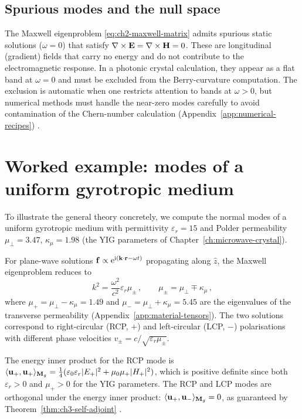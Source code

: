 \subsection{Spurious modes and the null space}
\label{sec:ch3-spurious}

The Maxwell eigenproblem \eqref{eq:ch2-maxwell-matrix} admits spurious
static solutions ($\omega=0$) that satisfy
$\nabla\times\mathbf{E}=\nabla\times\mathbf{H}=0$.  These are longitudinal
(gradient) fields that carry no energy and do not contribute to the
electromagnetic response.  In a photonic crystal calculation, they
appear as a flat band at $\omega=0$ and must be excluded from the
Berry-curvature computation.  The exclusion is automatic when one
restricts attention to bands at $\omega>0$, but numerical methods
must handle the near-zero modes carefully to avoid contamination of
the Chern-number calculation (Appendix~\ref{app:numerical-recipes})
\cite{price2022roadmap}.

\section{Worked example: modes of a uniform gyrotropic medium}
\label{sec:ch3-gyrotropic-example}

To illustrate the general theory concretely, we compute the normal
modes of a uniform gyrotropic medium with permittivity
$\varepsilon_r=15$ and Polder permeability
$\mu_\perp=3.47$, $\kappa_\mu=1.98$ (the YIG parameters of
Chapter~\ref{ch:microwave-crystal}).

For plane-wave solutions $\mathbf{f}\propto\mathrm{e}^{\mathrm{i}(\mathbf{k}\cdot\mathbf{r}-\omega t)}$
propagating along $\hat{z}$, the Maxwell eigenproblem reduces to
\begin{equation}\label{eq:ch3-gyrotropic-dispersion}
  k^2 = \frac{\omega^2}{c^2}\varepsilon_r\mu_\pm\,,
  \qquad
  \mu_\pm = \mu_\perp \mp \kappa_\mu\,,
\end{equation}
where $\mu_+=\mu_\perp-\kappa_\mu=1.49$ and
$\mu_-=\mu_\perp+\kappa_\mu=5.45$ are the eigenvalues of the
transverse permeability (Appendix~\ref{app:material-tensors}).
The two solutions correspond to right-circular (RCP, $+$) and
left-circular (LCP, $-$) polarisations with different phase
velocities $v_\pm=c/\sqrt{\varepsilon_r\mu_\pm}$.

The energy inner product for the RCP mode is
$\langle \mathbf{u}_+ , \mathbf{u}_+ \rangle_{\mathbf{M}_g}
=\frac{1}{4}(\varepsilon_0\varepsilon_r|E_+|^2+\mu_0\mu_+|H_+|^2)$,
which is positive definite since both $\varepsilon_r>0$ and
$\mu_+>0$ for the YIG parameters.  The RCP and LCP modes are
orthogonal under the energy inner product:
$\langle \mathbf{u}_+ , \mathbf{u}_- \rangle_{\mathbf{M}_g}=0$, as guaranteed by
Theorem~\ref{thm:ch3-self-adjoint} \cite{gangaraj2016berry}.

